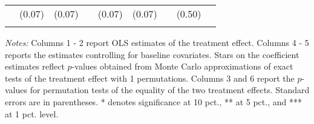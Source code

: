 \begin{table}[htbp]
{\begin{threeparttable}
\begin{tabular}{l*{8}{c}}
          &   (0.07)&   (0.07)&         &   (0.07)&   (0.07)&         &   (0.50)&         \\
          &         &         &         &         &         &         &         &         \\
\bottomrule \end{tabular} \begin{tablenotes}[flushleft] \footnotesize \item \emph{Notes:} Columns 1 - 2 report OLS estimates of the treatment effect. Columns 4 - 5 reports the estimates controlling for baseline covariates. Stars on the coefficient estimates reflect \(p\)-values obtained from Monte Carlo approximations of exact tests of the treatment effect with 1 permutations. Columns 3 and 6 report the \(p\)-values for permutation tests of the equality of the two treatment effects. Standard errors are in parentheses. * denotes significance at 10 pct., ** at 5 pct., and *** at 1 pct. level. \end{tablenotes} \end{threeparttable} } \end{table}

